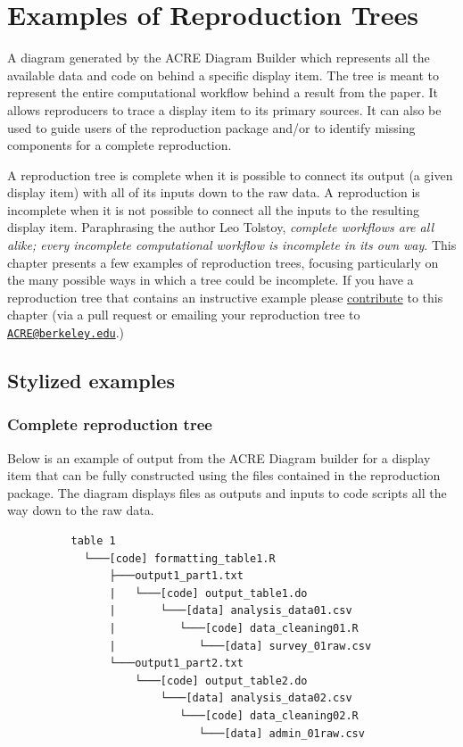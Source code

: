 \documentclass[
]{book}
\begin{document}
\hypertarget{examples-of-reproduction-trees}{%
\chapter{Examples of Reproduction Trees}\label{examples-of-reproduction-trees}}

A diagram generated by the ACRE Diagram Builder which represents all the available data and code on behind a specific display item. The tree is meant to represent the entire computational workflow behind a result from the paper. It allows reproducers to trace a display item to its primary sources. It can also be used to guide users of the reproduction package and/or to identify missing components for a complete reproduction.

A reproduction tree is complete when it is possible to connect its output (a given display item) with all of its inputs down to the raw data. A reproduction is incomplete when it is not possible to connect all the inputs to the resulting display item. Paraphrasing the author Leo Tolstoy, \emph{complete workflows are all alike; every incomplete computational workflow is incomplete in its own way}. This chapter presents a few examples of reproduction trees, focusing particularly on the many possible ways in which a tree could be incomplete. If you have a reproduction tree that contains an instructive example please \protect\hyperlink{contrib-guide}{contribute} to this chapter (via a pull request or emailing your reproduction tree to \href{mailto:ACRE@berkeley.edu}{\nolinkurl{ACRE@berkeley.edu}}.)

\hypertarget{stylized-examples}{%
\section{Stylized examples}\label{stylized-examples}}

\hypertarget{complete-reproduction-tree}{%
\subsection{Complete reproduction tree}\label{complete-reproduction-tree}}

Below is an example of output from the ACRE Diagram builder for a display item that can be fully constructed using the files contained in the reproduction package. The diagram displays files as outputs and inputs to code scripts all the way down to the raw data.

\begin{verbatim}
          table 1
            └───[code] formatting_table1.R
                ├───output1_part1.txt  
                |   └───[code] output_table1.do           
                |       └───[data] analysis_data01.csv
                |          └───[code] data_cleaning01.R
                |             └───[data] survey_01raw.csv
                └───output1_part2.txt  
                    └───[code] output_table2.do           
                        └───[data] analysis_data02.csv
                           └───[code] data_cleaning02.R
                              └───[data] admin_01raw.csv  
\end{verbatim}
\end{document}
